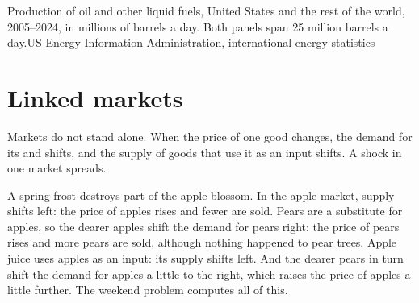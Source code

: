 \begin{omchart}{Production of oil and other liquid fuels, United States and the rest of the world, 2005--2024, in millions of barrels a
day. Both panels span 25 million barrels a day.}{US Energy Information Administration, international energy statistics}
\end{omchart}

\section{Linked markets}\label{sec:g10:market-equilibrium:linked}

Markets do not stand alone. When the price of one good changes, the demand for its  and  shifts, and the supply of
goods that use it as an input shifts. A shock in one market spreads.

\begin{example}\label{ex:g10:market-equilibrium:frost}
A spring frost destroys part of the apple blossom. In the apple market, supply shifts left: the price of apples rises and fewer are sold.
Pears are a substitute for apples, so the dearer apples shift the demand for pears right: the price of pears rises and more pears are sold,
although nothing happened to pear trees. Apple juice uses apples as an input: its supply shifts left. And the dearer pears in turn shift the
demand for apples a little to the right, which raises the price of apples a little further. The weekend problem computes all of this.
\end{example}

